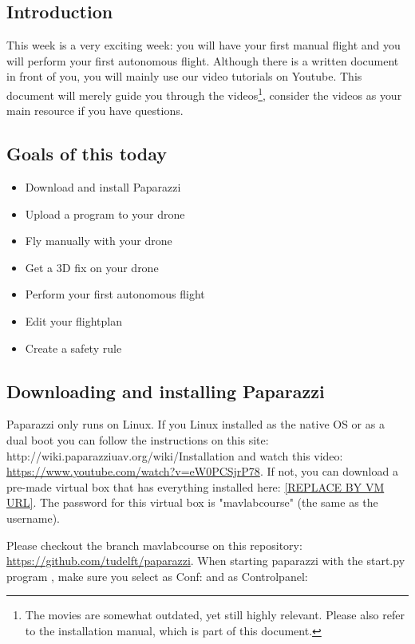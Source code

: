 \documentclass{article}
\begin{document}

\subsection*{Introduction}
This week is a very exciting week: you will have your first manual flight and you will perform your first autonomous flight. Although there is a written document in front of you, you will mainly use our video tutorials on Youtube. This document will merely guide you through the videos\footnote{The movies are somewhat outdated, yet still highly relevant. Please also refer to the installation manual, which is part of this document.}, consider the videos as your main resource if you have questions. 

\subsection*{Goals of this today}
\begin{itemize}
\item Download and install Paparazzi
\item Upload a program to your drone
\item Fly manually with your drone
\item Get a 3D fix on your drone
\item Perform your first autonomous flight
\item Edit your flightplan
\item Create a safety rule
\end{itemize}

\subsection*{Downloading and installing Paparazzi}
Paparazzi only runs on Linux. If you Linux installed as the native OS or as a dual boot you can follow the instructions on this site: http://wiki.paparazziuav.org/wiki/Installation and watch this video: \url{https://www.youtube.com/watch?v=eW0PCSjrP78}.
If not, you can download a pre-made virtual box that has everything installed here: \url{[REPLACE BY VM URL]}.
The password for this virtual box is "mavlabcourse" (the same as the username). 

Please checkout the branch mavlabcourse on this repository: \url{https://github.com/tudelft/paparazzi}.
When starting paparazzi with the start.py program , make sure you select as Conf:  and as Controlpanel:
\end{document}
